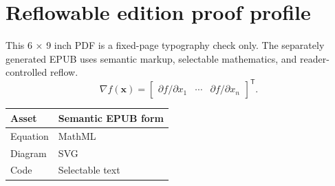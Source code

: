 \documentclass[11pt,oneside,openany]{book}
\begin{document}
\chapter{Reflowable edition proof profile}
This 6 × 9 inch PDF is a fixed-page typography check only. The separately generated EPUB uses semantic markup, selectable mathematics, and reader-controlled reflow.
\[
\nabla f(\mathbf{x}) =
\begin{bmatrix}
\partial f/\partial x_1 & \cdots & \partial f/\partial x_n
\end{bmatrix}^{\mathsf{T}}.
\]
\begin{longtable}{@{}ll@{}}
\toprule Asset & Semantic EPUB form \\
\midrule
Equation & MathML \\
Diagram & SVG \\
Code & Selectable text \\
\bottomrule
\end{longtable}
\end{document}
